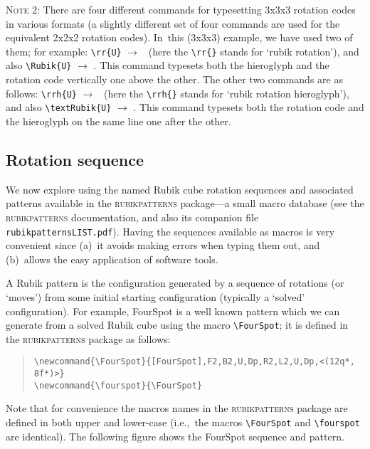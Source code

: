 \documentclass[a4paper]{article}
\begin{document}
{\noindent}\textsc{Note} 2: There are four different commands for typesetting 
 3x3x3 rotation codes in various formats (a slightly different set of four 
commands are used  for the equivalent 2x2x2 rotation codes). 
In~this  (3x3x3) example, we have used two of them; for example: 
{\newline}\verb!\rr{U}! $\rightarrow$  \ (here the \verb!\rr{}! stands 
for `rubik rotation'),  and also 
{\newline}\verb!\Rubik{U}! $\rightarrow$ . This command typesets 
both the hieroglyph and the rotation code vertically one above the other.
 The other two commands are as follows:
{\newline}\verb!\rrh{U}! $\rightarrow$  \ (here the \verb!\rrh{}! 
stands for `rubik rotation hieroglyph'),  and also 
{\newline}\verb!\textRubik{U}! $\rightarrow$ . This command 
typesets both the rotation code and the  hieroglyph on the same line one 
after the other.


\pagebreak

\subsection{Rotation sequence}

We now explore using the named Rubik cube rotation sequences and associated 
patterns available in the  \textsc{rubikpatterns} package---a small macro database 
(see the \textsc{rubikpatterns} documentation, and also its companion file \texttt{rubikpatternsLIST.pdf}). Having  the sequences available as  macros is 
very convenient since (a)~it avoids making errors when typing them out, 
and (b)~allows the easy application of software tools.
 
 A Rubik pattern  is the configuration generated  by a sequence of rotations 
 (or `moves') from some initial starting configuration  (typically a `solved' 
 configuration).  For example, FourSpot is a well known pattern which we can  
 generate  from a solved Rubik cube  using the macro \verb!\FourSpot!;  it is 
 defined in the \textsc{rubikpatterns} package as follows:
\begin{quote}
\begin{verbatim}
\newcommand{\FourSpot}{[FourSpot],F2,B2,U,Dp,R2,L2,U,Dp,<(12q*, 8f*)>}
\newcommand{\fourspot}{\FourSpot}
\end{verbatim}
\end{quote}
 Note that for convenience the macros names in the \textsc{rubikpatterns} package 
 are defined in  both upper and lower-case (i.e.,~the macros \verb!\FourSpot! 
 and \verb!\fourspot! are identical).  The following figure shows the FourSpot 
 sequence and pattern. 
\end{document}
